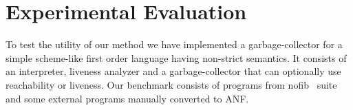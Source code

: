 \documentclass[9pt]{sigplanconf}
\newcommand{\comment}[1]{{\color{Myblue}{(#1)}}}
\begin{document}







\section{Experimental Evaluation}

To   test  the   utility  of   our  method   we  have   implemented  a
garbage-collector for a simple scheme-like first order language having
non-strict semantics. It consists of an interpreter, liveness analyzer
and a  garbage-collector that can  optionally use  reachability or
liveness.  Our  benchmark consists  of programs  from nofib~\cite{nofib}  suite and
some external programs manually converted to ANF.
\end{document}
